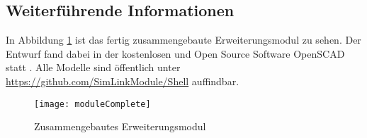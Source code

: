 \subsection{Weiterführende Informationen}
In Abbildung \ref{fig:moduleComplete} ist das fertig zusammengebaute Erweiterungsmodul zu sehen. Der Entwurf fand dabei in der kostenlosen und Open Source Software OpenSCAD statt \cite{aboutOpenScad}. Alle Modelle sind öffentlich unter \url{https://github.com/SimLinkModule/Shell} auffindbar.

\begin{figure}[h]
    \centering
    \texttt{[image: moduleComplete]}
    \caption{Zusammengebautes Erweiterungsmodul}
    \label{fig:moduleComplete}
\end{figure}